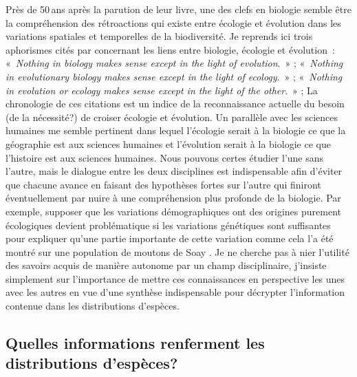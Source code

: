 Près de 50 ans après la parution de leur livre, une des clefs en
biologie semble être la compréhension des rétroactions qui existe entre
écologie et évolution dans les variations spatiales et temporelles de la
biodiversité. Je reprends ici trois aphorismes cités par
\citet{Schoener2011a} concernant les liens entre biologie, écologie et
évolution~: «~\emph{Nothing in biology makes sense except in the light
of evolution}.~» \citep{Dobzhansky1973}; «~\emph{Nothing in evolutionary
biology makes sense except in the light of ecology}.~»
\citep{grant2008}; «~\emph{Nothing in evolution or ecology makes sense
except in the light of the other}.~» \citep{Pelletier2009a}; La
chronologie de ces citations est un indice de la reconnaissance actuelle
du besoin (de la nécessité?) de croiser écologie et évolution. Un
parallèle avec les sciences humaines me semble pertinent dans lequel
l'écologie serait à la biologie ce que la géographie est aux sciences
humaines et l'évolution serait à la biologie ce que l'histoire est aux
sciences humaines. Nous pouvons certes étudier l'une sans l'autre, mais
le dialogue entre les deux disciplines est indispensable afin d'éviter
que chacune avance en faisant des hypothèses fortes sur l'autre qui
finiront éventuellement par nuire à une compréhension plus profonde de
la biologie. Par exemple, supposer que les variations démographiques ont
des origines purement écologiques devient problématique si les
variations génétiques sont suffisantes pour expliquer qu'une partie
importante de cette variation comme cela l'a été montré sur une
population de moutons de Soay \citep{Pelletier2007}. Je ne cherche pas à
nier l'utilité des savoirs acquis de manière autonome par un champ
disciplinaire, j'insiste simplement sur l'importance de mettre ces
connaissances en perspective les unes avec les autres en vue d'une
synthèse indispensable pour décrypter l'information contenue dans les
distributions d'espèces.

\subsection*{Quelles informations renferment les distributions
d'espèces?}\label{quelles-informations-renferment-les-distributions-despuxe8ces}

